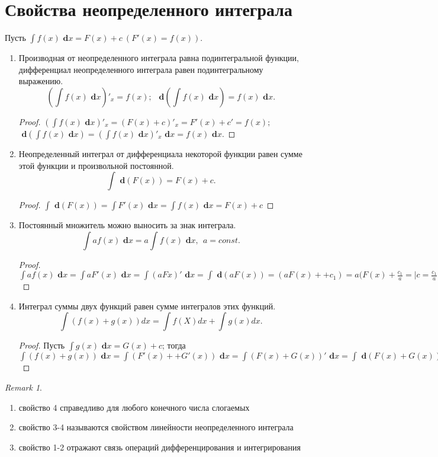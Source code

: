 \documentclass[a4paper,12pt]{bookest}
\theoremstyle{remark}
\newtheorem*{remark}{Remark}
\newcommand\dx{\textbf{ d}x}
\newcommand\dy{\textbf{ d}}
\begin{document}
\section{Свойства неопределенного интеграла}
Пусть $\int f(x)\dx=F(x)+c\>(F'(x)=f(x))$.
\begin{enumerate}
	\item Производная от неопределенного интеграла равна подинтегральной функции, дифференциал неопределенного интеграла равен подинтегральному выражению. \\
	$$(\int f(x)\dx)'_x=f(x);\>\> \dy(\int f(x)\dx)=f(x)\dx.$$
	\begin{proof}
		$(\int f(x)\dx)'_x=(F(x)+c)'_x=F'(x)+c'=f(x);$	\\$\dy(\int f(x)\dx)=(\int f(x)\dx)'_x\dx=f(x)\dx$.
	\end{proof}
	\item Неопределенный интеграл от дифференциала некоторой функции равен сумме этой функции и произвольной постоянной.
	$$\int \dy(F(x))=F(x)+c.$$
	\begin{proof}
		$\int \dy(F(x))=\int F'(x)\dx=\int f(x)\dx=F(x)+c$
	\end{proof}
	\item Постоянный множитель можно выносить за знак интеграла.
	$$\int af(x)\dx=a\int f(x)\dx,\>\> a=const.$$
	\begin{proof}
		$\int af(x)\dx=\int a F'(x)\dx=\int(aFx)'\dx=\int \dy(aF(x))=(aF(x)++c_1)=a(F(x)+\frac{c_1}{a}=\Big|c=\frac{c_1}{a}\Big|=a(f(x)+c)=a\int f(x)\dx$
	\end{proof}
	\item Интеграл суммы двух функций равен сумме интегралов этих функций.
	$$\int(f(x)+g(x))dx=\int f(X)dx+\int g(x)dx.$$
	\begin{proof}
		Пусть $\int g(x)\dx=G(x)+c$; тогда $\int(f(x)+g(x))\dx=\int(F'(x)++G'(x))\dx=\int(F(x)+G(x))'\dx=\int \dy(F(x)+G(x))=F(x)+G(x)++c=\Big|c=c_1+c_2\Big|=(F(x)+c_1)+(G(x)c_2)=\int f(x)\dx+\int g(x)\dx$
	\end{proof}
\end{enumerate}
\begin{remark}$ $
	\begin{enumerate}
		\item[-]свойство 4 справедливо для любого конечного числа слогаемых 
		\item[-]свойство 3-4 называются свойством линейности неопределенного интеграла 
		\item[-]свойство 1-2 отражают связь операций дифференцирования и интегрирования  
	\end{enumerate}		
\end{remark}
\end{document}
